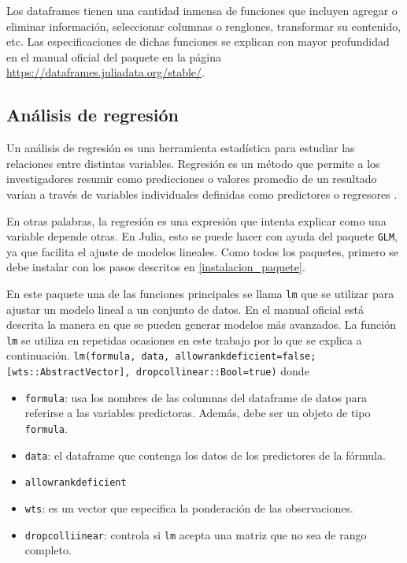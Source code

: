 Los dataframes tienen una cantidad inmensa de funciones que incluyen agregar o eliminar información, seleccionar columnas o renglones, transformar su contenido, etc. Las especificaciones de dichas funciones se explican con mayor profundidad en el manual oficial del paquete en la página \url{https://dataframes.juliadata.org/stable/}. 

\subsection{Análisis de regresión} \label{cap_regresiones}

Un análisis de regresión es una herramienta estadística para estudiar las relaciones entre distintas variables. Regresión es un método que permite a los investigadores resumir como predicciones o valores promedio de un resultado varían a través de variables individuales definidas como predictores o regresores \cite{regression_other_stories}. 

En otras palabras, la regresión es una expresión que intenta explicar como una variable depende otras. En \textsf{Julia}, esto se puede hacer con ayuda del paquete \texttt{GLM}, ya que facilita el ajuste de modelos lineales. Como todos los paquetes, primero se debe instalar con los pasos descritos en \ref{instalacion_paquete}. 

En este paquete una de las funciones principales se llama \texttt{lm} que se utilizar para ajustar un modelo lineal a un conjunto de datos. En el manual oficial \cite{glm_manual} está descrita la manera en que se pueden generar modelos más avanzados. La función \texttt{lm} se utiliza en repetidas ocasiones en este trabajo por lo que se explica a continuación. \texttt{lm(formula, data, allowrankdeficient=false; [wts::AbstractVector], dropcollinear::Bool=true)} donde 


\begin{itemize}
    \item \texttt{formula}: usa los nombres de las columnas del dataframe de datos para referirse a las variables predictoras. Además, debe ser un objeto de tipo \texttt{formula}. 
    
    \item \texttt{data}: el dataframe que contenga los datos de los predictores de la fórmula.
    
    \item \texttt{allowrankdeficient}
    
    \item \texttt{wts}: es un vector que especifica la ponderación de las observaciones. 
    
    \item \texttt{dropcolliinear}: controla si \texttt{lm} acepta una matriz que no sea de rango completo. 
\end{itemize}



